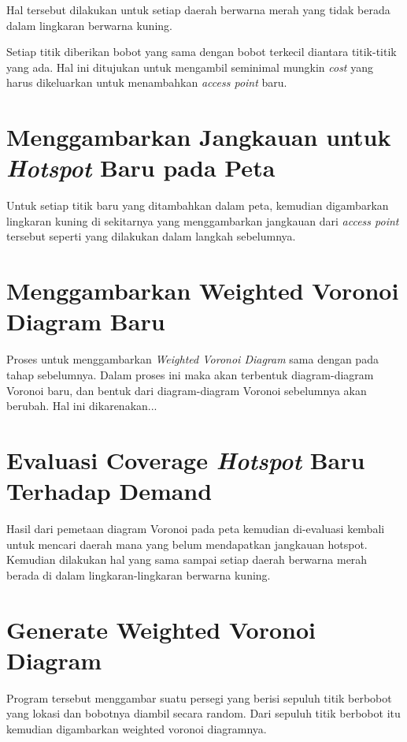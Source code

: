 Hal tersebut dilakukan untuk setiap daerah berwarna merah yang tidak berada dalam lingkaran berwarna kuning. 

Setiap titik diberikan bobot yang sama dengan bobot terkecil diantara titik-titik yang ada. Hal ini ditujukan untuk mengambil seminimal mungkin \textit{cost} yang harus dikeluarkan untuk menambahkan \textit{access point} baru. 

\section{Menggambarkan Jangkauan untuk \textit{Hotspot} Baru pada Peta}

Untuk setiap titik baru yang ditambahkan dalam peta, kemudian digambarkan lingkaran kuning di sekitarnya yang menggambarkan jangkauan dari \textit{access point} tersebut seperti yang dilakukan dalam langkah sebelumnya.

\section{Menggambarkan Weighted Voronoi Diagram Baru}

Proses untuk menggambarkan \textit{Weighted Voronoi Diagram} sama dengan pada tahap sebelumnya. Dalam proses ini maka akan terbentuk diagram-diagram Voronoi baru, dan bentuk dari diagram-diagram Voronoi sebelumnya akan berubah. Hal ini dikarenakan...

\section{Evaluasi Coverage \textit{Hotspot} Baru Terhadap Demand}

Hasil dari pemetaan diagram Voronoi pada peta kemudian di-evaluasi kembali untuk mencari daerah mana yang belum mendapatkan jangkauan hotspot. Kemudian dilakukan hal yang sama sampai setiap daerah berwarna merah berada di dalam lingkaran-lingkaran berwarna kuning.

\section{Generate Weighted Voronoi Diagram}

Program tersebut menggambar suatu persegi yang berisi sepuluh titik berbobot yang lokasi dan bobotnya diambil secara random. Dari sepuluh titik berbobot itu kemudian digambarkan weighted voronoi diagramnya. \cite{voronoi.R}


